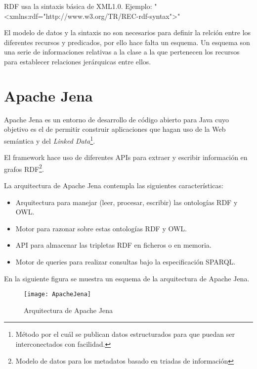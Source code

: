 \newpage
RDF usa la sintaxis básica de XML1.0. Ejemplo: "<xmlns:rdf="http://www.w3.org/TR/REC-rdf-syntax">"

El modelo de datos y la sintaxis no son necesarios para definir la relción entre los diferentes recursos y predicados, por ello hace falta un esquema.
Un esquema son una serie de informaciones relativas a la clase a la que pertenecen los recursos para establecer relaciones jerárquicas entre ellos.

\section{Apache Jena}

Apache Jena es un entorno de desarrollo de código abierto para Java cuyo objetivo es el de permitir construir aplicaciones que hagan uso de la Web semántica y del \textit{Linked Data}\footnote{Método por el cuál se publican datos estructurados para que puedan ser interconectados con facilidad.}. 

El framework hace uso de diferentes APIs para extraer y escribir información en grafos RDF\footnote{Modelo de datos para los metadatos basado en triadas de información}.\cite{wiki:jena}

La arquitectura de Apache Jena contempla las siguientes características:

\begin{itemize}
	\item{Arquitectura para manejar (leer, procesar, escribir) las ontologías RDF y OWL.}
	\item{Motor para razonar sobre estas ontologías RDF y OWL.}
	\item{API para almacenar las tripletas RDF en ficheros o en memoria.}
	\item{Motor de queries para realizar consultas bajo la especificación SPARQL.}\cite{jena}
\end{itemize}

En la siguiente figura se muestra un esquema de la arquitectura de Apache Jena.



\begin{figure}[tph]
    \begin{center}%
          \begin{center}%
            \texttt{[image: ApacheJena]}%
            \caption{Arquitectura de Apache Jena}%
            \label{figJena}%
          \end{center}%
    \end{center}%
  \end{figure}%

